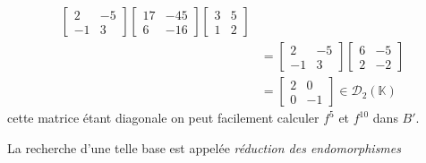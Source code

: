 \documentclass[11pt,colorlinks]{book}
\theoremstyle{mytheoremstyle}
\theoremstyle{mytheoremstyle}
\theoremstyle{mytheoremstyle}
\theoremstyle{mytheoremstyle}
\theoremstyle{mytheoremstyle}
\theoremstyle{mytheoremstyle}
\theoremstyle{mytheoremstyle}
\theoremstyle{mytheoremstyle}
\theoremstyle{myproblemstyle}
\def\mbb#1{\mathbb{#1}}
\def\mfc#1{\mathcal{#1}}
\def\bK{\mbb{K}}
\begin{document}
\begin{ex}
\begin{align*}
\begin{bmatrix}
        2 & -5 \\ 
        -1 & 3
       \end{bmatrix} 
       \begin{bmatrix}
        17 & -45 \\ 
        6 & -16 
       \end{bmatrix}
       \begin{bmatrix}
        3 & 5 \\ 
        1 & 2
       \end{bmatrix} \\ 
       &= \begin{bmatrix}
        2 & -5 \\ 
        -1 & 3
       \end{bmatrix} 
       \begin{bmatrix}
        6 & -5 \\ 
        2 & -2
       \end{bmatrix} \\
       &= \begin{bmatrix}
        2 & 0 \\ 
        0 & -1
       \end{bmatrix} \in \mfc{D}_2(\bK)
  \end{align*}
  cette matrice étant diagonale on peut facilement calculer $f^{5}$ et $f^{10}$ dans $B'$.\newline 

  La recherche d'une telle base est appelée \textit{réduction des endomorphismes}
\end{ex}
\end{document}
